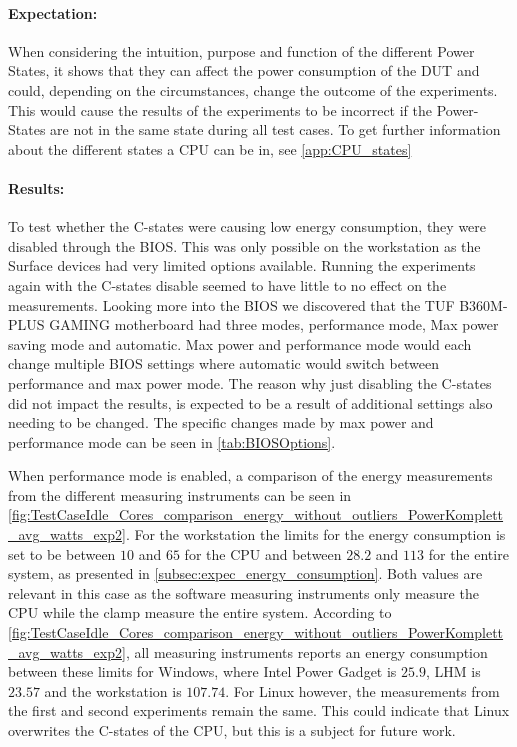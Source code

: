 \paragraph*{Expectation:} When considering the intuition, purpose and function of the different Power States, it shows that they can affect the power consumption of the DUT and could, depending on the circumstances, change the outcome of the experiments. This would cause the results of the experiments to be incorrect if the Power-States are not in the same state during all test cases. To get further information about the different states a CPU can be in, see \cref{app:CPU_states}

\paragraph*{Results:} To test whether the C-states were causing low energy consumption, they were disabled through the  BIOS. This was only possible on the workstation as the Surface devices had very limited options available. Running the experiments again with the C-states disable seemed to have little to no effect on the measurements. Looking more into the BIOS we discovered that the TUF B360M-PLUS GAMING motherboard had three modes, performance mode, Max power saving mode and automatic. Max power and performance mode would each change multiple BIOS settings where automatic would switch between performance and max power mode. The reason why just disabling the C-states did not impact the results, is expected to be a result of additional settings also needing to be changed. The specific changes made by max power and performance mode can be seen in \cref{tab:BIOSOptions}.



When performance mode is enabled, a comparison of the energy measurements from the different measuring instruments can be seen in \cref{fig:TestCaseIdle_Cores_comparison_energy_without_outliers_PowerKomplett_avg_watts_exp2}. For the workstation the limits for the energy consumption is set to be between $10$ and $65$ for the CPU and between $28.2$ and $113$ for the entire system, as presented in \cref{subsec:expec_energy_consumption}. Both values are relevant in this case as the software measuring instruments only measure the CPU while the clamp measure the entire system. According to \cref{fig:TestCaseIdle_Cores_comparison_energy_without_outliers_PowerKomplett_avg_watts_exp2}, all measuring instruments reports an energy consumption between these limits for Windows, where Intel Power Gadget is $25.9$, LHM is $23.57$ and the workstation is $107.74$. For Linux however, the measurements from the first and second experiments remain the same. This could indicate that Linux overwrites the C-states of the CPU, but this is a subject for future work.


